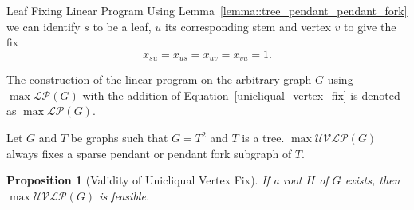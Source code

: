 \documentclass[10pt]{beamer}
\newtheorem{proposition}{Proposition}
\begin{document}
\begin{frame}{Leaf Fixing Linear Program}
    \small
    Using Lemma~\eqref{lemma::tree_pendant_pendant_fork} we can identify $s$ to be a leaf, $u$ its corresponding stem and vertex $v$ to give the fix
    \begin{equation} \label{eq::unicliqual_vertex_fix}
        x_{su}=x_{us}=x_{uv}=x_{vu}=1.
    \end{equation}

    The construction of the linear program on the arbitrary graph $G$ using $\max \mathcal{LP}(G)$ with the addition of Equation~\eqref{unicliqual_vertex_fix} is denoted as $\max \mathcal{LP}(G)$. 

    \begin{lemma} \label{lemma::unicliqual_vertex_fix}
        Let $G$ and $T$ be graphs such that $G = T^2$ and $T$ is a tree. $\max\mathcal{UVLP}(G)$ always fixes a sparse pendant or pendant fork subgraph of $T$.
    \end{lemma}

    \begin{proposition}[Validity of Unicliqual Vertex Fix] \label{prop::unicliqual_vertex_fix_feasibility}
        If a root $H$ of $G$ exists, then $\max\mathcal{UVLP}(G)$ is feasible.
    \end{proposition}
    

\end{frame}
\end{document}
